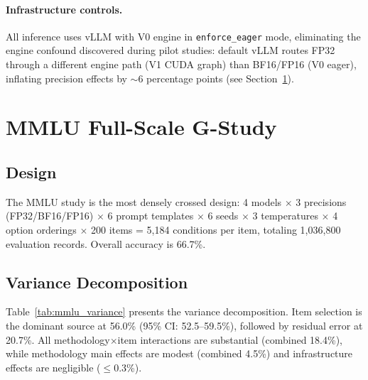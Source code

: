 \documentclass[11pt]{article}
\begin{document}
\paragraph{Infrastructure controls.}
All inference uses vLLM with V0 engine in \texttt{enforce\_eager} mode, eliminating the engine confound discovered during pilot studies: default vLLM routes FP32 through a different engine path (V1 CUDA graph) than BF16/FP16 (V0 eager), inflating precision effects by $\sim$6 percentage points (see Section~\ref{sec:mmlu}).


\section{MMLU Full-Scale G-Study}
\label{sec:mmlu}

\subsection{Design}

The MMLU study is the most densely crossed design: 4 models $\times$ 3 precisions (FP32/BF16/FP16) $\times$ 6 prompt templates $\times$ 6 seeds $\times$ 3 temperatures $\times$ 4 option orderings $\times$ 200 items = 5{,}184 conditions per item, totaling 1{,}036{,}800 evaluation records. Overall accuracy is 66.7\%.

\subsection{Variance Decomposition}

Table~\ref{tab:mmlu_variance} presents the variance decomposition. Item selection is the dominant source at 56.0\% (95\% CI: 52.5--59.5\%), followed by residual error at 20.7\%.
All methodology$\times$item interactions are substantial (combined 18.4\%), while methodology main effects are modest (combined 4.5\%) and infrastructure effects are negligible ($\leq$0.3\%).
\end{document}
